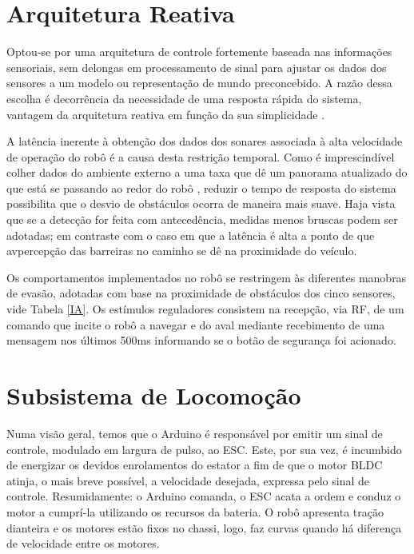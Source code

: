 \section{Arquitetura Reativa} 

Optou-se por uma arquitetura de controle fortemente baseada nas informações sensoriais, sem delongas em processamento de sinal para ajustar os dados 
dos sensores a um modelo ou representação de mundo preconcebido. 
A razão dessa escolha é decorrência da necessidade de uma resposta rápida do sistema, vantagem da arquitetura reativa em função da sua simplicidade 
\cite{roseli}.

A latência inerente à obtenção dos dados dos sonares \cite{jones} associada à alta velocidade de operação do robô é a causa desta restrição 
temporal. %
Como é imprescindível colher dados do ambiente externo a uma taxa que dê um panorama atualizado do que está se passando ao redor do robô 
\cite{brooks}, reduzir o tempo de resposta do sistema possibilita que o desvio de obstáculos ocorra de maneira mais suave.
Haja vista que se a detecção for feita com antecedência, medidas menos bruscas podem ser adotadas; em contraste com o caso em que a latência é alta a 
ponto de que avpercepção das barreiras no caminho se dê na proximidade do veículo.

Os comportamentos implementados no robô se restringem às diferentes manobras de evasão, adotadas com base na proximidade de obstáculos dos cinco 
sensores, vide Tabela \ref{IA}. Os estímulos reguladores consistem na recepção, via RF, de um comando que incite o robô a navegar e do aval mediante 
recebimento de uma mensagem nos últimos 500ms informando se o botão de segurança foi acionado.

\section{Subsistema de Locomoção}
Numa visão geral, temos que o Arduino é responsável por emitir um sinal de controle, modulado em largura de pulso, ao ESC.
Este, por sua vez, é incumbido de energizar os devidos enrolamentos do estator a fim de que o motor BLDC atinja, o mais breve possível, a velocidade 
desejada, expressa pelo sinal de controle. 
Resumidamente: o Arduino comanda, o ESC acata a ordem e conduz o motor a cumprí-la utilizando os recursos da bateria.
O robô apresenta tração dianteira e os motores estão fixos no chassi, logo, faz curvas quando há diferença de velocidade entre os motores.

